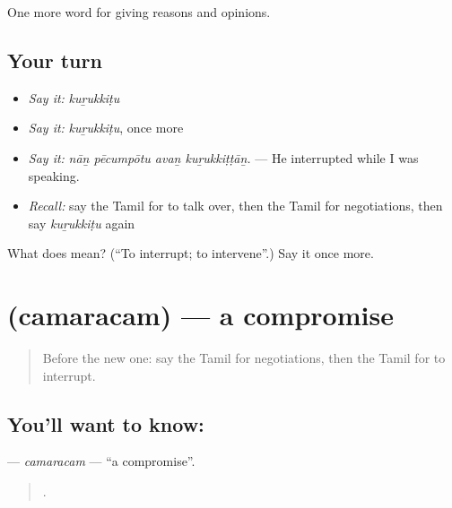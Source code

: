 \begin{grammarlens}[title={What you've built}]
One more word for giving reasons and opinions.
\end{grammarlens}

\subsection*{Your turn}
\begin{itemize}
\raggedright
  \item \emph{Say it:} \emph{kuṟukkiṭu}
  \item \emph{Say it:} \emph{kuṟukkiṭu}, once more
  \item \emph{Say it:} \emph{nāṉ pēcumpōtu avaṉ kuṟukkiṭṭāṉ.} — He interrupted while I was speaking.
  \item \emph{Recall:} say the Tamil for to talk over, then the Tamil for negotiations, then say \emph{kuṟukkiṭu} again
\end{itemize}

\begin{tcolorbox}[breakable,colback=teal!4,colframe=teal!35!black,title={Before you move on}]
What does  mean? (\textquotedblleft{}To interrupt; to intervene\textquotedblright{}.) Say it once more.
\end{tcolorbox}
\section[\texorpdfstring{\ta{சமரசம்} (camaracam)}{சமரசம் (camaracam)}]{ (camaracam) — a compromise}

\label{lesson:TA-C356-camaracam}



\begin{quote}
Before the new one: say the Tamil for negotiations, then the Tamil for to interrupt.
\end{quote}

\subsection*{You'll want to know: }
\textbf{} — \emph{camaracam} — \textquotedblleft{}a compromise\textquotedblright{}.

\begin{quote}
     .
\end{quote}

